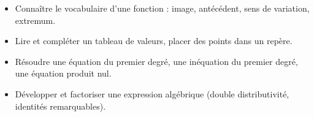\documentclass[10pt,a4paper]{article}
\begin{document}

\vspace{-0.3cm}

\begin{prerequis}
\begin{itemize}
    \item Connaître le vocabulaire d'une fonction : image, antécédent, sens de variation, extremum.
    \item Lire et compléter un tableau de valeurs, placer des points dans un repère.
    \item Résoudre une équation du premier degré,  une inéquation du premier degré, une équation produit nul.
    \item Développer et factoriser une expression algébrique (double distributivité, identités remarquables).
    
    
\end{itemize}
\end{prerequis}
\end{document}

